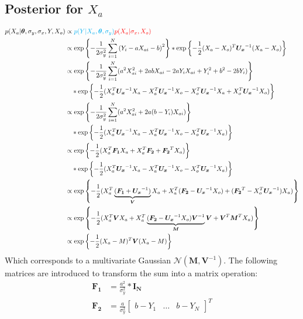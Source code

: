 \documentclass[10pt]{article}
\renewcommand{\vec}[1]{\boldsymbol{#1}}
\newcommand{\mat}[1]{\boldsymbol{#1}}
\begin{document}
\subsection{Posterior for $X_a$}
\begin{align}
    p(X_a | \vec{\theta}, \sigma_y, \sigma_x, Y, X_o) &\propto {\color{cyan} p(Y | X_a, \vec{\theta}, \sigma_y)} {\color{red} p(X_a | \sigma_x, X_o)} \\
    &\propto \exp\left\{ - \frac{1}{2\sigma_y^2} \sum_{i=1}^N \left( Y_i - a X_{ai} - b \right)^2 \right\} * \exp\left\{ - \frac{1}{2} (X_a - X_o)^T \mat{U_x}^{-1} (X_a - X_o) \right\} \\
    
    &\propto \exp\left\{ - \frac{1}{2\sigma_y^2} \sum_{i=1}^N (a^2 X_{ai}^2  + 2 a b X_{ai} - 2 a Y_i X_{ai} + Y_i^2 + b^2 -2 b Y_i) \right\} \nonumber \\
    &\quad * \exp\left\{ - \frac{1}{2} ( X_a^T \mat{U_x}^{-1} X_a - X_a^T \mat{U_x}^{-1} X_o -X_o^T \mat{U_x}^{-1} X_a + X_o^T \mat{U_x}^{-1} X_o ) \right\} \\
    
    &\propto \exp\left\{ - \frac{1}{2\sigma_y^2} \sum_{i=1}^N (a^2 X_{ai}^2  + 2 a (b - Y_i) X_{ai} ) \right\} \nonumber \\
    &\quad * \exp\left\{ - \frac{1}{2} ( X_a^T \mat{U_x}^{-1} X_a - X_a^T \mat{U_x}^{-1} X_o -X_o^T \mat{U_x}^{-1} X_a) \right\} \\
    
    &\propto \exp\left\{ - \frac{1}{2} (X_a^T \mat{F_1} X_a + X_a^T \vec{F_2} + \vec{F_2}^T X_a) \right\} \nonumber \\
    &\quad * \exp\left\{ - \frac{1}{2} ( X_a^T \mat{U_x}^{-1} X_a - X_a^T \mat{U_x}^{-1} X_o -X_o^T \mat{U_x}^{-1} X_a) \right\} \\
    
    &\propto \exp\left\{ - \frac{1}{2} (X_a^T \underbrace{(\mat{F_1} + \mat{U_x}^{-1})}_{\mat{V}} X_a + X_a^T (\vec{F_2} - \mat{U_x}^{-1} X_o) + (\vec{F_2}^T - X_o^T \mat{U_x}^{-1}) X_a) \right\} \\
    
    &\propto \exp\left\{ - \frac{1}{2} (X_a^T \mat{V} X_a + X_a^T \underbrace{(\vec{F_2} - \mat{U_x}^{-1} X_o) \mat{V}^{-1}}_{\vec{M}} \mat{V} + \mat{V}^T \vec{M}^T X_a) \right\} \\
    
    &\propto \exp\left\{ - \frac{1}{2} (X_a - M)^T \mat{V} (X_a - M) \right\}

\end{align}
Which corresponds to a multivariate Gaussian $\mathcal{N}(\vec{M}, \mat{V}^{-1})$. 
The following matrices are introduced to transform the sum into a matrix operation:
\begin{align}
    \mat{F_1} &= \frac{a^2}{\sigma_y^2} * \mat{I_N} \\
    \vec{F_2} &= \frac{a}{\sigma_y^2} \begin{bmatrix} b-Y_1 & \dots & b-Y_N \end{bmatrix}^T
\end{align}
\end{document}
